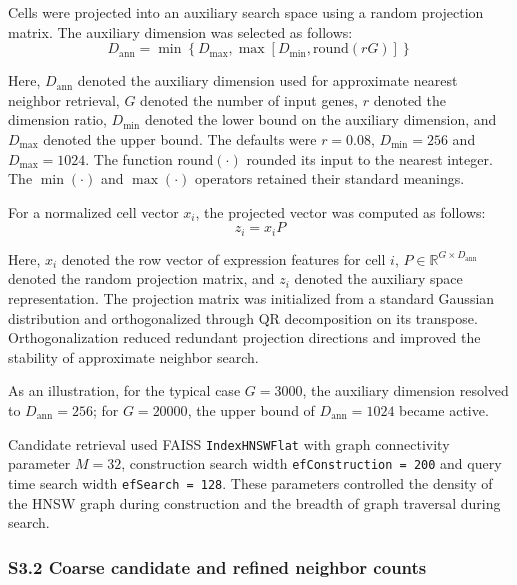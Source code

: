 \documentclass[11pt]{article}
\begin{document}
Cells were projected into an auxiliary search space using a random projection matrix. The auxiliary dimension was selected as follows:
\begin{equation}
D_{\mathrm{ann}} =
\min\left\{D_{\max}, \max\left[D_{\min}, \mathrm{round}(rG)\right]\right\}
\label{eq:aux_dim}
\end{equation}

Here, \(D_{\mathrm{ann}}\) denoted the auxiliary dimension used for approximate nearest neighbor retrieval, \(G\) denoted the number of input genes, \(r\) denoted the dimension ratio, \(D_{\min}\) denoted the lower bound on the auxiliary dimension, and \(D_{\max}\) denoted the upper bound. The defaults were \(r=0.08\), \(D_{\min}=256\) and \(D_{\max}=1024\). The function \(\mathrm{round}(\cdot)\) rounded its input to the nearest integer. The \(\min(\cdot)\) and \(\max(\cdot)\) operators retained their standard meanings.

For a normalized cell vector \(x_i\), the projected vector was computed as follows:
\begin{equation}
z_i = x_i P
\label{eq:random_projection}
\end{equation}

Here, \(x_i\) denoted the row vector of expression features for cell \(i\), \(P \in \mathbb{R}^{G \times D_{\mathrm{ann}}}\) denoted the random projection matrix, and \(z_i\) denoted the auxiliary space representation. The projection matrix was initialized from a standard Gaussian distribution and orthogonalized through QR decomposition on its transpose. Orthogonalization reduced redundant projection directions and improved the stability of approximate neighbor search.

As an illustration, for the typical case \(G=3000\), the auxiliary dimension resolved to \(D_{\mathrm{ann}}=256\); for \(G=20000\), the upper bound of \(D_{\mathrm{ann}}=1024\) became active.

Candidate retrieval used FAISS \texttt{IndexHNSWFlat} with graph connectivity parameter \(M=32\), construction search width \texttt{efConstruction = 200} and query time search width \texttt{efSearch = 128}. These parameters controlled the density of the HNSW graph during construction and the breadth of graph traversal during search.

\subsubsection*{S3.2 Coarse candidate and refined neighbor counts}
\end{document}
